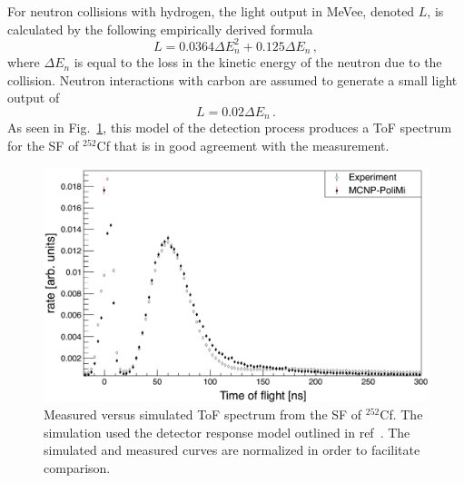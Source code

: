 For neutron collisions with hydrogen, the light output in MeVee, denoted $L$, is calculated by the following empirically derived formula~\cite{MPPost}
\begin{displaymath}
L = 0.0364 \Delta E_n^2 +  0.125 \Delta E_n \, ,
\end{displaymath}
where $\Delta E_n$ is equal to the loss in the kinetic energy of the neutron due to the collision.
Neutron interactions with carbon are assumed to generate a small light output of
\begin{displaymath}
L = 0.02 \Delta E_n \, .
\end{displaymath}
As seen in Fig.~\ref{fig:Cf252MCNPVsEXP}, this model of the detection process produces a ToF spectrum for the SF of $^{252}$Cf that is in good agreement with the measurement.
\begin{figure}
    \centering
    \includegraphics[width = \figsize\textwidth]{Cf252MCNPVsEXP.png}
    \caption{
    Measured versus simulated ToF spectrum from the SF of $^{252}$Cf.
    The simulation used the detector response model outlined in ref~\cite{MPPost}.
    The simulated and measured curves are normalized in order to facilitate comparison.
    }
    \label{fig:Cf252MCNPVsEXP}
\end{figure} %

